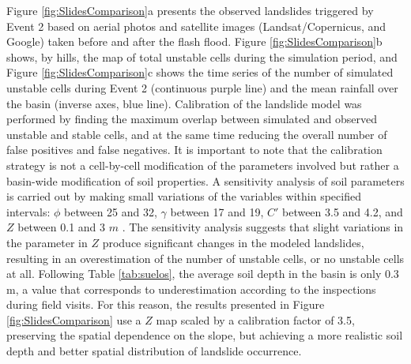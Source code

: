 \documentclass[hess, manuscript]{copernicus}
\begin{document}
Figure \ref{fig:SlidesComparison}a presents the observed landslides triggered by Event 2  based on aerial photos and satellite images (Landsat/Copernicus, and Google) taken before and after the flash flood.  Figure \ref{fig:SlidesComparison}b shows,  by hills, the map of total unstable cells during the simulation period, and Figure \ref{fig:SlidesComparison}c shows the time series of the number of simulated unstable cells during Event 2 (continuous purple line) and the mean rainfall over the basin (inverse axes, blue line). Calibration of the landslide model was performed by finding the maximum overlap between simulated and observed unstable and stable cells, and at the same time reducing the overall number of false positives and false negatives. It is important to note that the calibration strategy is not a cell-by-cell modification of the parameters involved but rather a basin-wide modification of soil properties. A sensitivity analysis of soil parameters is carried out by making small variations of the variables within specified intervals: $\phi$ between 25 and 32, $\gamma$ between 17 and 19,  $C'$ between 3.5 and 4.2, and $Z$ between 0.1 and 3 $m$ . The sensitivity analysis suggests that slight variations in the parameter in $Z$ produce significant changes in the modeled landslides, resulting in an overestimation of the number of unstable cells, or no unstable cells at all. Following Table \ref{tab:suelos}, the average soil depth in the basin is only 0.3 m, a value that corresponds to underestimation according to the inspections during field visits. For this reason, the results presented in Figure \ref{fig:SlidesComparison} use a  $Z$ map scaled by a calibration factor of 3.5, preserving the spatial dependence on the slope, but achieving a more realistic soil depth and better spatial distribution of landslide occurrence.\\ 
\end{document}
